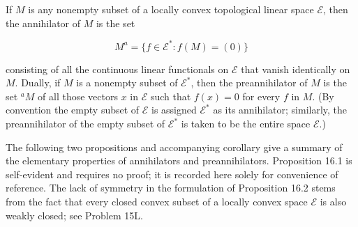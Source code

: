 If $M$ is any nonempty subset of a locally convex topological linear space $\mathcal{E}$, then the annihilator of $M$ is the set

$$M^a = \{ f \in \mathcal{E}^* : f(M) = (0) \}$$

consisting of all the continuous linear functionals on $\mathcal{E}$ that vanish identically on $M$. Dually, if $M$ is a nonempty subset of $\mathcal{E}^*$, then the preannihilator of $M$ is the set $^a M$ of all those vectors $x$ in $\mathcal{E}$ such that $f(x) = 0$ for every $f$ in $M$. (By convention the empty subset of $\mathcal{E}$ is assigned $\mathcal{E}^*$ as its annihilator; similarly, the preannihilator of the empty subset of $\mathcal{E}^*$ is taken to be the entire space $\mathcal{E}$.)

The following two propositions and accompanying corollary give a summary of the elementary properties of annihilators and preannihilators. Proposition 16.1 is self-evident and requires no proof; it is recorded here solely for convenience of reference. The lack of symmetry in the formulation of Proposition 16.2 stems from the fact that every closed convex subset of a locally convex space $\mathcal{E}$ is also weakly closed; see Problem 15L.
